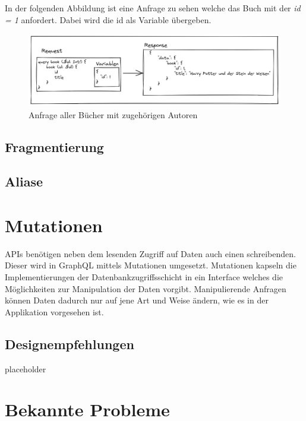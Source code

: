 In der folgenden Abbildung ist eine Anfrage zu sehen welche das Buch mit der \textit{id = 1} anfordert. Dabei wird die id als Variable übergeben.

\begin{figure}[H]
    \includegraphics[width=\textwidth]{pics/book_request_with_parameter.png}
    \caption{Anfrage aller Bücher mit zugehörigen Autoren}
\end{figure}

\subsection{Fragmentierung}

\subsection{Aliase}

\section{Mutationen}
APIs benötigen neben dem lesenden Zugriff auf Daten auch einen schreibenden.
Dieser wird in GraphQL mittels Mutationen umgesetzt.
Mutationen kapseln die Implementierungen der Datenbankzugriffsschicht in ein Interface welches die Möglichkeiten zur Manipulation der Daten vorgibt.
Manipulierende Anfragen können Daten dadurch nur auf jene Art und Weise ändern, wie es in der Applikation vorgesehen ist.



\subsection{Designempfehlungen}

placeholder
\pagebreak

\section{Bekannte Probleme}

